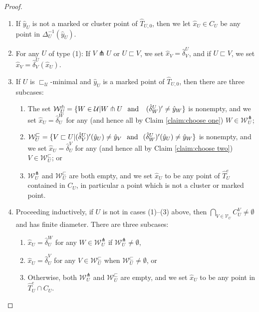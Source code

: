 \documentclass{amsart}
\theoremstyle{definition}
\theoremstyle{remark}
\theoremstyle{definition}
\newcommand{\calU}{\mathcal{U}}
\newcommand{\calV}{\mathcal{V}}
\newcommand{\calW}{\mathcal{W}}
\newcommand{\hT}{\widehat{T}}
\newcommand{\hx}{\hat{x}}
\newcommand{\hy}{\hat{y}}
\newcommand{\hd}{\hat{\delta}}
\newcommand{\nest}{\sqsubset}
\begin{document}
\begin{proof}
\begin{enumerate}
\item If $\hy_U$ is not a marked or cluster point of $\hT_{U,0}$, then we let $\hx_U \in C_U$ be any point in $\Delta^{-1}_U(\hy_U)$.
\item For any $U$ of type (1): If $V \pitchfork U$ or $U \nest V$, we set $\hx_V = \hd^U_V$, and if $U \nest V$, we set $\hx_V = \hd^U_V(\hx_U)$.
\item If $U$ is $\nest_{\calU}$-minimal and $\hy_U$ is a marked point of $\hT_{U,0}$, then there are three subcases: \label{item:minimal choice}
\begin{enumerate}
\item The set $\calW_U^{\pitchfork} = \{W \in \calU| W \pitchfork U \hspace{.1in}  \textrm{and } \hspace{.1in} (\hd^U_W)' \neq \hy_W\}$ is nonempty, and we set $\hx_U = \hd^W_U$ for any (and hence all by Claim \ref{claim:choose one}) $W \in \calW_U^{\pitchfork}$;
\item $\calW_U^{\nest} = \{V \nest U| (\hd^U_V)'(\hy_U) \neq \hy_V \hspace{.1in} \textrm{and} \hspace{.1in} (\hd^U_W)'(\hy_U) \neq \hy_W\}$ is nonempty, and we set $\hx_U = \hd^V_U$ for any (and hence all by Claim \ref{claim:choose two}) $V \in \calW_U^{\nest}$; or 
\item $\calW_U^{\pitchfork}$ and $\calW_U^{\nest}$ are both empty, and we set $\hx_U$ to be any point of $\hT^e_U$ contained in $C_U$, in particular a point which is not a cluster or marked point. 
\end{enumerate}
\item Proceeding inductively, if $U$ is not in cases (1)--(3) above, then $\bigcap_{V \in \calV_U} C^V_U \neq \emptyset$ and has finite diameter.  There are three subcases: \label{item:general choice}
\begin{enumerate}
\item $\hx_U = \hd^W_U$ for any $W \in \calW_U^{\pitchfork}$ if $ \calW_U^{\pitchfork} \neq \emptyset$, \label{item:choose transverse}
\item $\hx_U = \hd^V_U$ for any $V \in \calW_U^{\nest}$ when $\calW_U^{\nest} \neq \emptyset$, or \label{item:choose nested}
\item Otherwise, both $\calW_U^{\pitchfork}$ and $\calW_U^{\nest}$ are empty, and we set $\hx_U$ to be any point in $\hT^e_U \cap C_U$.
\end{enumerate}


\end{enumerate}
\end{proof}
\end{document}

